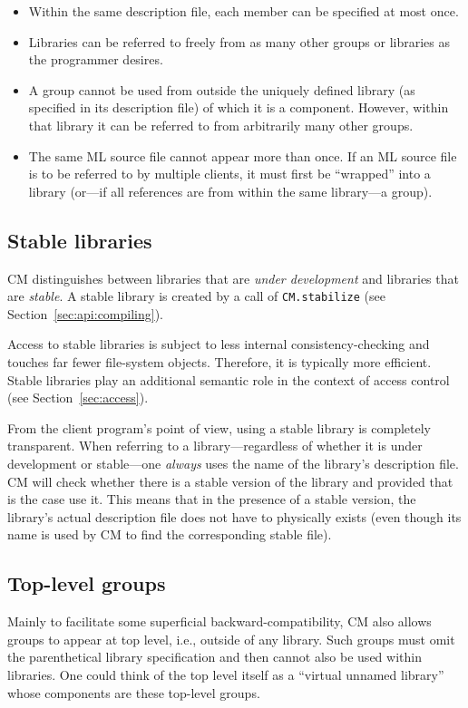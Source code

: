 \begin{itemize}
\item Within the same description file, each member can be specified
at most once.
\item Libraries can be referred to freely from as many other groups or
libraries as the programmer desires.
\item A group cannot be used from outside the uniquely defined library
(as specified in its description file) of which it is a component.
However, within that library it can be referred to from arbitrarily
many other groups.
\item The same ML source file cannot appear more than once.  If an ML
source file is to be referred to by multiple clients, it must first be
``wrapped'' into a library (or---if all references are from within the
same library---a group).
\end{itemize}

\subsection{Stable libraries}
\label{sec:stable}

CM distinguishes between libraries that are {\em under development}
and libraries that are {\em stable}.  A stable library is created by a
call of {\tt CM.stabilize} (see Section~\ref{sec:api:compiling}).

Access to stable libraries is subject to less internal
consistency-checking and touches far fewer file-system
objects. Therefore, it is typically more efficient.  Stable libraries
play an additional semantic role in the context of access control (see
Section~\ref{sec:access}).

From the client program's point of view, using a stable library is
completely transparent.  When referring to a library---regardless of
whether it is under development or stable---one {\em always} uses the
name of the library's description file.  CM will check whether there
is a stable version of the library and provided that is the case use
it.  This means that in the presence of a stable version, the
library's actual description file does not have to physically exists
(even though its name is used by CM to find the corresponding stable
file).

\subsection{Top-level groups}

Mainly to facilitate some superficial backward-compatibility, CM also
allows groups to appear at top level, i.e., outside of any library.
Such groups must omit the parenthetical library specification and then
cannot also be used within libraries. One could think of the top level
itself as a ``virtual unnamed library'' whose components are these
top-level groups.
